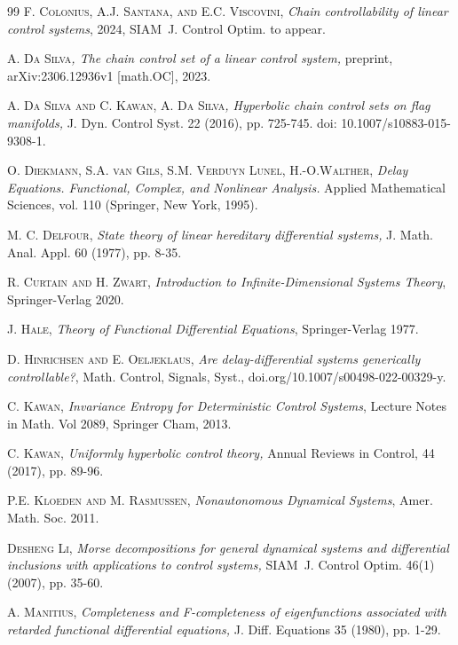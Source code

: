 \documentclass{siamltex}%
\begin{document}
\begin{thebibliography}{99}
\textsc{F. Colonius, A.J. Santana, and E.C. Viscovini,}
\emph{Chain controllability of linear control systems}, 2024, SIAM\ J. Control
Optim. to appear.

\textsc{A. Da Silva}\emph{, The chain control set of a
linear control system,} preprint, arXiv:2306.12936v1 [math.OC], 2023.

\textsc{A. Da Silva and C. Kawan, A. Da Silva}\emph{,
Hyperbolic chain control sets on flag manifolds,} J. Dyn. Control Syst. 22
(2016), pp. 725-745. doi: 10.1007/s10883-015-9308-1.

\textsc{O. Diekmann, S.A. van Gils, S.M. Verduyn Lunel,
H.-O.Walther, }\emph{Delay Equations. Functional, Complex, and Nonlinear
Analysis. }Applied Mathematical Sciences, vol. 110 (Springer, New York, 1995).

\textsc{M. C. Delfour,} \emph{State theory of linear
hereditary differential systems,} J. Math. Anal. Appl. 60 (1977), pp. 8-35.

\textsc{R. Curtain and H. Zwart,} \emph{Introduction to
Infinite-Dimensional Systems Theory}, Springer-Verlag 2020.

\textsc{J. Hale,} \emph{Theory of Functional Differential
Equations}, Springer-Verlag 1977.

\textsc{D. Hinrichsen and E. Oeljeklaus,}\emph{ Are
delay-differential systems generically controllable?}, Math. Control, Signals,
Syst., doi.org/10.1007/s00498-022-00329-y.

\textsc{C. Kawan,}\emph{ Invariance Entropy for
Deterministic Control Systems}, Lecture Notes in Math. Vol 2089, Springer
Cham, 2013.

\textsc{C. Kawan,}\emph{ Uniformly hyperbolic control
theory, }Annual Reviews in Control, 44 (2017), pp. 89-96.

\textsc{P.E. Kloeden and M. Rasmussen,} \emph{Nonautonomous
Dynamical Systems}, Amer. Math. Soc. 2011.

\textsc{Desheng Li,} \emph{Morse decompositions for general
dynamical systems and differential inclusions with applications to control
systems,} SIAM\ J. Control Optim. 46(1) (2007), pp. 35-60.

\textsc{A. Manitius,} \emph{Completeness and F-completeness
of eigenfunctions associated with retarded functional differential equations,}
J. Diff. Equations 35 (1980), pp. 1-29.


\end{thebibliography}
\end{document}
